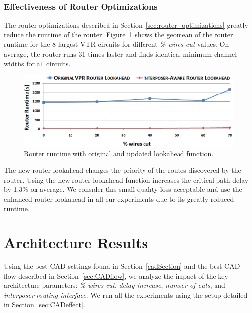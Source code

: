 \documentclass[journal]{IEEEtran}
\begin{document}
\subsubsection{Effectiveness of Router Optimizations}
\label{sec:effectiveness_of_router_enhancements}
The router optimizations described in Section~\ref{sec:router_optimizations} greatly reduce the runtime of the router. Figure~\ref{fig:lookahead_runtime} shows the geomean of the router runtime for the 8 largest VTR circuits for different \textit{\% wires cut} values. On average, the router runs 31 times faster and finds identical minimum channel widths for all circuits.

\begin{figure}[!hb]
\centering
\includegraphics[width=\linewidth]{router_opt.eps}
\caption{Router runtime with original and updated lookahead function.}
\label{fig:lookahead_runtime}
\end{figure}

The new router lookahead changes the priority of the routes discovered by the router. Using the new router lookahead function increases the critical path delay by 1.3\% on average. We consider this small quality loss acceptable and use the enhanced router lookahead in all our experiments due to its greatly reduced runtime.



\section{Architecture Results}
\label{resultsSection}

Using the best CAD settings found in Section~\ref{cadSection} and the best CAD flow described in Section~\ref{sec:CADflow}, we analyze the impact of the key architecture parameters: \textit{\% wires cut}, \textit{delay increase}, \textit{number of cuts}, and \textit{interposer-routing interface}. We run all the experiments using the setup detailed in Section~\ref{sec:CADeffect}.
\end{document}
